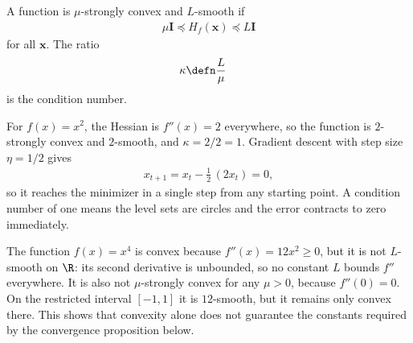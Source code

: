 \documentclass[a4paper, 12pt]{book}
\begin{document}
\begin{definition}
    A function is $\mu$-strongly convex and $L$-smooth if
    \begin{align}
        \mu \mathbf{I} \preceq H_f(\mathbf{x}) \preceq L \mathbf{I}
    \end{align}
for all $\mathbf{x}$. The ratio
 \begin{align}
    \kappa &\defn \frac{L}{\mu}
 \end{align}
is the condition number.
\end{definition}

\begin{example}
    For $f(x)=x^2$, the Hessian is $f''(x)=2$ everywhere, so the function is
    $2$-strongly convex and $2$-smooth, and $\kappa=2/2=1$. Gradient descent
    with step size $\eta=1/2$ gives
    \begin{align}
        x_{t+1} = x_t - \frac{1}{2}\,(2x_t) = 0,
    \end{align}
    so it reaches the minimizer in a single step from any starting point. A
    condition number of one means the level sets are circles and the error
    contracts to zero immediately.
\end{example}

\begin{example}
    The function $f(x)=x^4$ is convex because $f''(x)=12x^2\geq0$, but it is not
    $L$-smooth on $\R$: its second derivative is unbounded, so no constant $L$
    bounds $f''$ everywhere. It is also not $\mu$-strongly convex for any
    $\mu>0$, because $f''(0)=0$. On the restricted interval $[-1,1]$ it is
    $12$-smooth, but it remains only convex there. This shows that convexity
    alone does not guarantee the constants required by the convergence
    proposition below.
\end{example}
\end{document}
